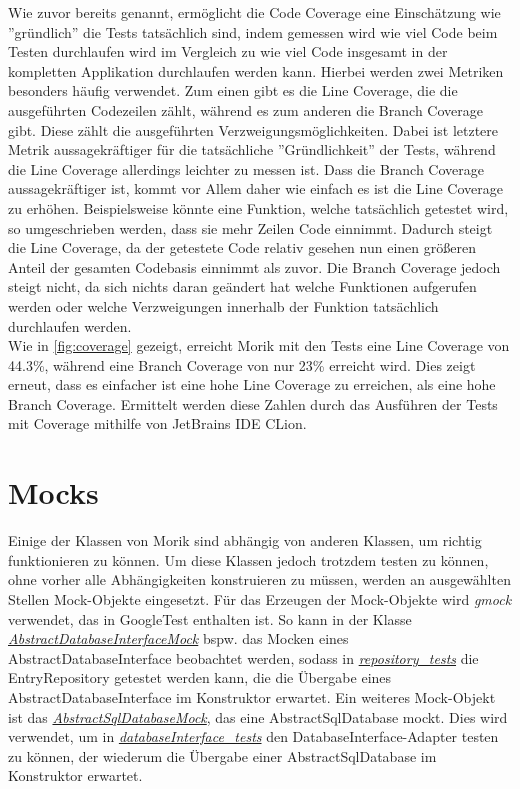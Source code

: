 Wie zuvor bereits genannt, ermöglicht die Code Coverage eine Einschätzung wie ''gründlich'' die Tests tatsächlich sind, indem gemessen wird wie viel Code beim Testen durchlaufen wird im Vergleich zu wie viel Code insgesamt in der kompletten Applikation durchlaufen werden kann. Hierbei werden zwei Metriken besonders häufig verwendet. Zum einen gibt es die Line Coverage, die die ausgeführten Codezeilen zählt, während es zum anderen die Branch Coverage gibt. Diese zählt die ausgeführten Verzweigungsmöglichkeiten. Dabei ist letztere Metrik aussagekräftiger für die tatsächliche ''Gründlichkeit'' der Tests, während die Line Coverage allerdings leichter zu messen ist. Dass die Branch Coverage aussagekräftiger ist, kommt vor Allem daher wie einfach es ist die Line Coverage zu erhöhen. Beispielsweise könnte eine Funktion, welche tatsächlich getestet wird, so umgeschrieben werden, dass sie mehr Zeilen Code einnimmt. Dadurch steigt die Line Coverage, da der getestete Code relativ gesehen nun einen größeren Anteil der gesamten Codebasis einnimmt als zuvor. Die Branch Coverage jedoch steigt nicht, da sich nichts daran geändert hat welche Funktionen aufgerufen werden oder welche Verzweigungen innerhalb der Funktion tatsächlich durchlaufen werden.\\
Wie in \autoref{fig:coverage} gezeigt, erreicht Morik mit den Tests eine Line Coverage von 44.3\%, während eine Branch Coverage von nur 23\% erreicht wird. Dies zeigt erneut, dass es einfacher ist eine hohe Line Coverage zu erreichen, als eine hohe Branch Coverage.  Ermittelt werden diese Zahlen durch das Ausführen der Tests mit Coverage mithilfe von JetBrains IDE CLion.

\section{Mocks}
Einige der Klassen von Morik sind abhängig von anderen Klassen, um richtig funktionieren zu können. Um diese Klassen jedoch trotzdem testen zu können, ohne vorher alle Abhängigkeiten konstruieren zu müssen, werden an ausgewählten Stellen Mock-Objekte eingesetzt. Für das Erzeugen der Mock-Objekte wird \textit{gmock} verwendet, das in GoogleTest enthalten ist. So kann in der Klasse \href{https://github.com/moorts/Morik/blob/main/src/tests/application/AbstractDatabaseInterfaceMock.h}{\textit{AbstractDatabaseInterfaceMock}} bspw. das Mocken eines AbstractDatabaseInterface beobachtet werden, sodass in \href{https://github.com/moorts/Morik/blob/main/src/tests/application/repository_tests.cpp}{\textit{repository\_tests}} die EntryRepository getestet werden kann, die die Übergabe eines AbstractDatabaseInterface im Konstruktor erwartet. Ein weiteres Mock-Objekt ist das \href{https://github.com/moorts/Morik/blob/main/src/tests/adapters/database/AbstractSqlDatabaseMock.h}{\textit{AbstractSqlDatabaseMock}}, das eine AbstractSqlDatabase mockt. Dies wird verwendet, um in \href{https://github.com/moorts/Morik/blob/main/src/tests/adapters/database/databaseInterface_tests.cpp}{\textit{databaseInterface\_tests}} den DatabaseInterface-Adapter testen zu können, der wiederum die Übergabe einer AbstractSqlDatabase im Konstruktor erwartet.

